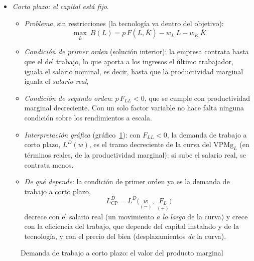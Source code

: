 \documentclass[11pt]{article}
\begin{document}
\begin{itemize}
\item \emph{Corto plazo: el capital está fijo}.
  \begin{itemize}
  \item \emph{Problema}, sin restricciones (la tecnología va dentro del objetivo):
    \[
    \max_{L}\ B(L)=p\,F(L,\overline{K})-w_L\,L-w_K\,\overline{K}
    \]
  \item \emph{Condición de primer orden} (solución interior): la empresa contrata hasta que el  del trabajo, lo que aporta a los ingresos el último trabajador, iguala el salario nominal, es decir, hasta que la productividad marginal iguala el \emph{salario real},
  \item \emph{Condición de segundo orden}: $p\,F_{LL}<0$, que se cumple con productividad marginal decreciente. Con un solo factor variable no hace falta ninguna condición sobre los rendimientos a escala.
  \item \emph{Interpretación gráfica} (gráfico~\ref{fig:demanda-corto}): con $F_{LL}<0$, la demanda de trabajo a corto plazo, $L^D(w)$, es el tramo decreciente de la curva del $\mathrm{VPMg}_L$ (en términos reales, de la productividad marginal): si sube el salario real, se contrata menos.
  \item \emph{De qué depende}: la condición de primer orden ya es la demanda de trabajo a corto plazo,
    \[
    L^D_{\mathrm{CP}}=L^D\Big(\underset{(-)}{w},\ \underset{(+)}{F_L}\Big)
    \]
    decrece con el salario real (un movimiento \emph{a lo largo} de la curva) y crece con la eficiencia del trabajo, que depende del capital instalado y de la tecnología, y con el precio del bien (desplazamientos \emph{de} la curva).
  \end{itemize}
\end{itemize}

\begin{figure}[H]
\centering
\caption{Demanda de trabajo a corto plazo: el valor del producto marginal}\label{fig:demanda-corto}
\end{figure}
\end{document}
